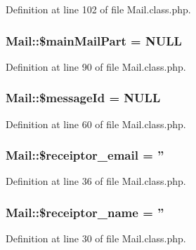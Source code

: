 Definition at line 102 of file Mail.\-class.\-php.

\hypertarget{classMail_ad58544ae1c34119ec852e3c22b855624}{
\subsubsection[{\$main\-Mail\-Part}]{\setlength{\rightskip}{0pt plus 5cm}Mail\-::\$main\-Mail\-Part = N\-U\-L\-L}}\label{classMail_ad58544ae1c34119ec852e3c22b855624}


Definition at line 90 of file Mail.\-class.\-php.

\hypertarget{classMail_a48caf58883e736f50ab87a03147c584a}{
\subsubsection[{\$message\-Id}]{\setlength{\rightskip}{0pt plus 5cm}Mail\-::\$message\-Id = N\-U\-L\-L}}\label{classMail_a48caf58883e736f50ab87a03147c584a}


Definition at line 60 of file Mail.\-class.\-php.

\hypertarget{classMail_aa034785886f8bdcf3a5ed9c86ce8ed14}{
\subsubsection[{\$receiptor\-\_\-email}]{\setlength{\rightskip}{0pt plus 5cm}Mail\-::\$receiptor\-\_\-email = ''}}\label{classMail_aa034785886f8bdcf3a5ed9c86ce8ed14}


Definition at line 36 of file Mail.\-class.\-php.

\hypertarget{classMail_a44df4937f3c8b2691e9bbb1220c667f3}{
\subsubsection[{\$receiptor\-\_\-name}]{\setlength{\rightskip}{0pt plus 5cm}Mail\-::\$receiptor\-\_\-name = ''}}\label{classMail_a44df4937f3c8b2691e9bbb1220c667f3}


Definition at line 30 of file Mail.\-class.\-php.

